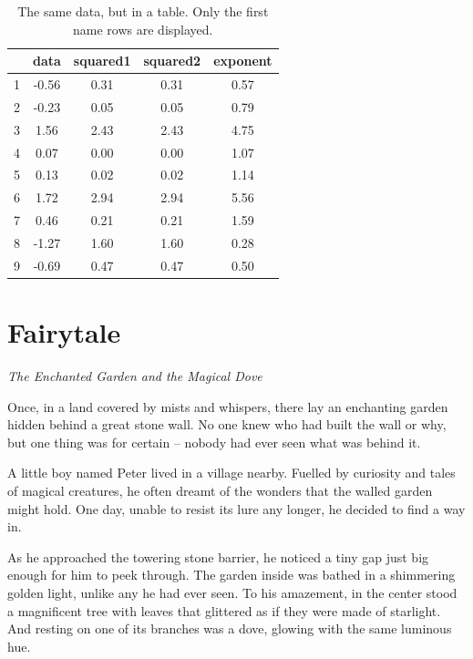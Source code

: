 \documentclass[10pt, a4paper, titlepage]{article}
\begin{document}
\begin{table}[htbp]
   \centering
    \caption{The same data, but in a table. Only the first name rows are displayed.}
    \begin{tabular}{@{}ccccc@{}}
         \toprule
         & \textbf{data}& \textbf{squared1} & \textbf{squared2} & \textbf{exponent} \\ \midrule
         1  & -0.56 & 0.31 & 0.31 & 0.57 \\
         2  & -0.23 & 0.05 & 0.05 & 0.79 \\
         3  & 1.56  & 2.43  & 2.43 & 4.75 \\
         4  & 0.07  & 0.00  & 0.00 & 1.07 \\
         5  & 0.13  & 0.02  & 0.02 & 1.14 \\
         6  & 1.72  & 2.94  & 2.94 & 5.56 \\
         7  & 0.46  & 0.21  & 0.21 & 1.59 \\
         8  & -1.27 & 1.60 & 1.60 & 0.28 \\
         9  & -0.69 & 0.47 & 0.47 & 0.50 \\ \bottomrule
    \end{tabular}  
\end{table}

\newpage
\section{Fairytale}

\textit{The Enchanted Garden and the Magical Dove}


Once, in a land covered by mists and whispers, there lay an enchanting garden hidden behind a great stone wall. No one knew who had built the wall or why, but one thing was for certain – nobody had ever seen what was behind it.

A little boy named Peter lived in a village nearby. Fuelled by curiosity and tales of magical creatures, he often dreamt of the wonders that the walled garden might hold. One day, unable to resist its lure any longer, he decided to find a way in.

As he approached the towering stone barrier, he noticed a tiny gap just big enough for him to peek through. The garden inside was bathed in a shimmering golden light, unlike any he had ever seen. To his amazement, in the center stood a magnificent tree with leaves that glittered as if they were made of starlight. And resting on one of its branches was a dove, glowing with the same luminous hue.
\end{document}
